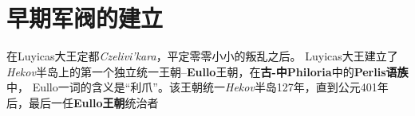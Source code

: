 \chapter{早期军阀的建立}
在Luyicas大王定都\textit{Czelivi'kara}，平定零零小小的叛乱之后。
Luyicas大王建立了\textit{Hekov}半岛上的第一个独立统一王朝--\textbf{Eullo}王朝，在\textbf{古-中Philoria}中的\textbf{Perlis语族}中，
Eullo一词的含义是“利爪”。该王朝统一\textit{Hekov}半岛127年，直到公元401年后，最后一任\textbf{Eullo王朝}统治者
